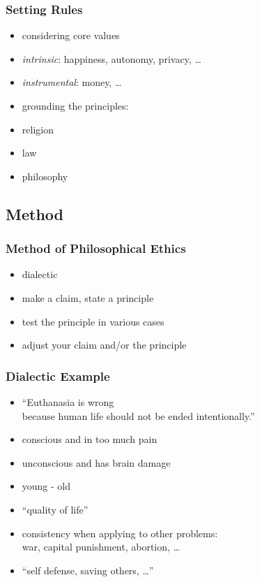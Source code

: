 \documentclass[dvipsnames]{beamer}
\theoremstyle{plain}
\begin{document}
\begin{frame}
  \frametitle{Setting Rules}

  \begin{itemize}
    \item considering \alert{core values}
    \item \emph{intrinsic}: happiness, autonomy, privacy, \ldots
    \item \emph{instrumental}: money, \ldots

    \pause
    \bigskip
    \item grounding the principles:
    \smallskip
    \item religion
    \item law
    \item philosophy
  \end{itemize}
\end{frame}

\subsection{Method}

\begin{frame}
  \frametitle{Method of Philosophical Ethics}

  \begin{itemize}
    \item \alert{dialectic}

    \medskip
    \item make a claim, state a principle
    \item test the principle in various cases
    \item adjust your claim and/or the principle
  \end{itemize}
\end{frame}

\begin{frame}
  \frametitle{Dialectic Example}

  \begin{itemize}
    \item ``Euthanasia is wrong\\
      because human life should not be ended intentionally.''

    \pause
    \medskip
    \item conscious and in too much pain
    \item unconscious and has brain damage
    \item young - old

    \pause
    \smallskip
    \item ``quality of life''

    \pause
    \medskip
    \item consistency when applying to other problems:\\
      war, capital punishment, abortion, \ldots
    \item ``self defense, saving others, \ldots''
  \end{itemize}
\end{frame}
\end{document}
